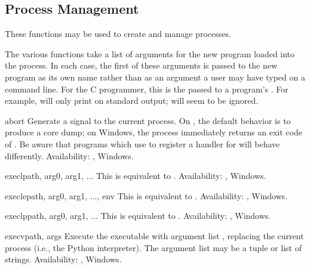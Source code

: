 \subsection{Process Management \label{os-process}}

These functions may be used to create and manage processes.

The various  functions take a list of arguments for
the new program loaded into the process.  In each case, the first of
these arguments is passed to the new program as its own name rather
than as an argument a user may have typed on a command line.  For the
C programmer, this is the  passed to a program's
.  For example,  will only print  on standard output; 
will seem to be ignored.


\begin{funcdesc}{abort}{}
Generate a  signal to the current process.  On
\UNIX, the default behavior is to produce a core dump; on Windows, the 
process immediately returns an exit code of .  Be aware that
programs which use  to register a handler
for  will behave differently.
Availability: \UNIX, Windows.
\end{funcdesc}

\begin{funcdesc}{execl}{path, arg0, arg1, ...}
This is equivalent to
.
Availability: \UNIX{}, Windows.
\end{funcdesc}

\begin{funcdesc}{execle}{path, arg0, arg1, ..., env}
This is equivalent to
.
Availability: \UNIX{}, Windows.
\end{funcdesc}

\begin{funcdesc}{execlp}{path, arg0, arg1, ...}
This is equivalent to
.
Availability: \UNIX{}, Windows.
\end{funcdesc}

\begin{funcdesc}{execv}{path, args}
Execute the executable  with argument list ,
replacing the current process (i.e., the Python interpreter).
The argument list may be a tuple or list of strings.
Availability: \UNIX{}, Windows.
\end{funcdesc}

